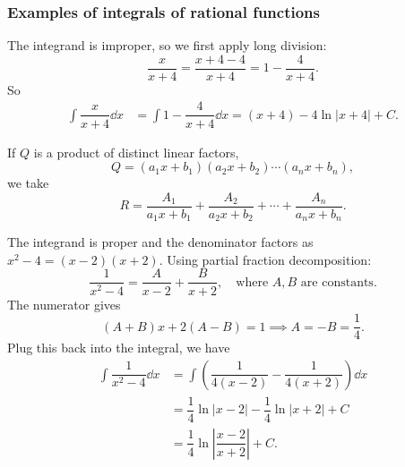 \subsubsection{Examples of integrals of rational functions}

\begin{ex} \label{ex: an improper rational funciton}
    The integrand is improper, so we first apply long division:
    \[\dfrac{x}{x+4} = \dfrac{x+4-4}{x+4} = 1-\dfrac{4}{x+4}.\]
    So 
    \begin{align*}
    \int \dfrac{x}{x+4} \dd x &= \int 1-\dfrac{4}{x+4} \dd x = (x+4) - 4 \ln|x+4| + C.
\end{align*}
\end{ex}


\begin{tcolorbox}
    If $Q$ is a product of distinct linear factors, 
    \[Q = (a_1x+b_1)(a_2x+b_2) \cdots (a_nx+b_n),\]
    we take 
    \[R = \dfrac{A_1}{a_1x+b_1} + \dfrac{A_2}{a_2x+b_2} + \cdots + \dfrac{A_n}{a_nx+b_n}.\]
\end{tcolorbox}
\begin{ex}
    The integrand is proper and the denominator factors as $x^2 - 4 = (x-2)(x+2)$. Using partial fraction decomposition:
    \[\dfrac{1}{x^2-4} = \dfrac{A}{x-2} + \dfrac{B}{x+2}, \quad \text{where } A, B \text{ are constants.} \]
    The numerator gives 
    \[(A+B)x + 2(A-B) = 1 \implies A = -B = \dfrac{1}{4}.\]
    Plug this back into the integral, we have
    \begin{align*}
        \int \dfrac{1}{x^2-4} \dd x &= \int \left(\dfrac{1}{4(x-2)} - \dfrac{1}{4(x+2)}\right) \dd x \\
        &= \dfrac{1}{4} \ln|x-2| - \dfrac{1}{4} \ln|x+2| + C \\
        &= \dfrac{1}{4} \ln\left|\dfrac{x-2}{x+2}\right| + C.
    \end{align*}
\end{ex}

